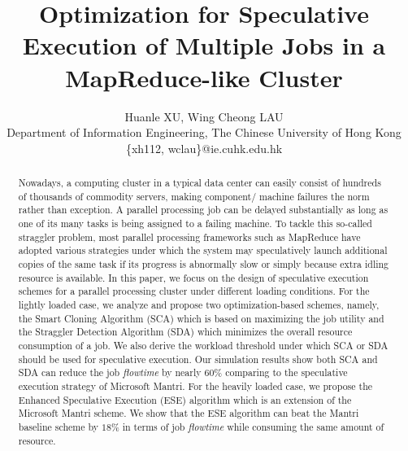 \documentclass[10pt,conference]{IEEEtran}
\begin{document}
\title{Optimization for Speculative Execution of Multiple Jobs in a MapReduce-like Cluster}

\author{Huanle XU, Wing Cheong LAU \\ Department of Information Engineering, The Chinese University of Hong Kong\\\{xh112, wclau\}@ie.cuhk.edu.hk \\
}

\maketitle

\vspace{-0.5cm}

\begin{abstract}
Nowadays, a computing cluster in a typical data center can easily consist of hundreds of thousands of commodity servers, making component/ machine failures the norm rather than exception. A parallel processing
job can be delayed substantially as long as one of its many tasks is being assigned to a failing machine.
To tackle this so-called straggler problem, most parallel processing frameworks such as MapReduce have adopted various strategies under which the system may speculatively launch additional copies of the same task if its progress is abnormally slow or simply because extra idling resource is available.  In this paper, we focus on the design  of  speculative execution schemes for a parallel processing cluster under different loading conditions.
For the lightly loaded case, we analyze and propose two optimization-based schemes, namely, the Smart Cloning Algorithm (SCA) which is based on maximizing the job utility and the Straggler Detection Algorithm (SDA) which minimizes the overall resource consumption of a job. We also derive the workload threshold under which SCA or SDA should be used for speculative execution. Our simulation results show both SCA and SDA can reduce the job \textit{flowtime} by nearly $60\%$ comparing to the speculative execution strategy of Microsoft Mantri.
For the heavily loaded case, we propose the Enhanced Speculative Execution (ESE) algorithm which is an extension of the Microsoft Mantri scheme. We show that the ESE algorithm can beat the Mantri baseline scheme by $18\%$ in terms of job \textit{flowtime} while consuming the same amount of resource.





\end{abstract}
\end{document}
